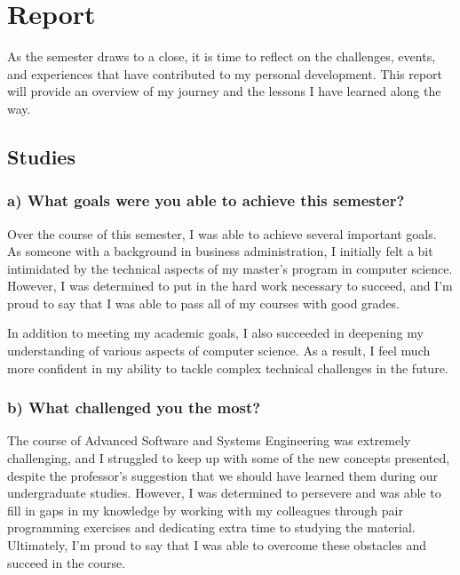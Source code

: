 \documentclass{core/report-template}
\begin{document}
\setlength{\parindent}{0pt}

\setlength{\parskip}{.8em} 
\newpage
\section{Report}

 As the semester draws to a close, it is
time to reflect on the challenges, events,
and experiences that have contributed to
my personal development. This report
will provide an overview of my journey and
the lessons I have learned along the way.


\subsection{Studies}
\subsubsection{a) What goals were you able to achieve this semester?}

Over the course of this semester, I was able to achieve several important goals. As someone with a background in business administration, I initially felt a bit intimidated by the technical aspects of my master's program in computer science. However, I was determined to put in the hard work necessary to succeed, and I'm proud to say that I was able to pass all of my courses with good grades. 

In addition to meeting my academic goals, I also succeeded in deepening my understanding of various aspects of computer science. As a result, I feel much more confident in my ability to tackle complex technical challenges in the future. 

\subsubsection{b) What challenged you the most?}
The course of Advanced Software and Systems Engineering was extremely challenging, and I struggled to keep up with some of the new concepts presented, despite the professor's suggestion that we should have learned them during our undergraduate studies. However, I was determined to persevere and was able to fill in gaps in my knowledge by working with my colleagues through pair programming exercises and dedicating extra time to studying the material. Ultimately, I'm proud to say that I was able to overcome these obstacles and succeed in the course.
\end{document}
